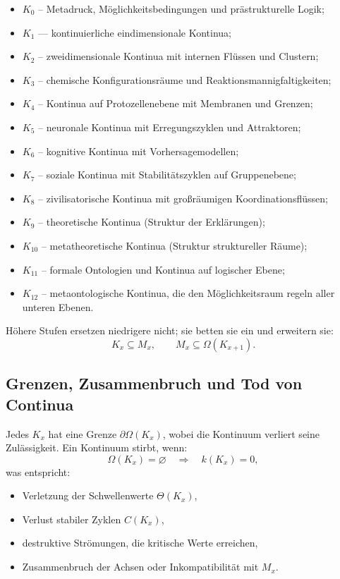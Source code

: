 \begin{itemize}
    \item $K_0$ – Metadruck, Möglichkeitsbedingungen und prästrukturelle Logik;
    \item $K_1$ — kontinuierliche eindimensionale Kontinua;
    \item $K_2$ – zweidimensionale Kontinua mit internen Flüssen und Clustern;
    \item $K_3$ – chemische Konfigurationsräume und Reaktionsmannigfaltigkeiten;
    \item $K_4$ – Kontinua auf Protozellenebene mit Membranen und Grenzen;
    \item $K_5$ – neuronale Kontinua mit Erregungszyklen und Attraktoren;
    \item $K_6$ – kognitive Kontinua mit Vorhersagemodellen;
    \item $K_7$ – soziale Kontinua mit Stabilitätszyklen auf Gruppenebene;
    \item $K_8$ – zivilisatorische Kontinua mit großräumigen Koordinationsflüssen;
    \item $K_9$ – theoretische Kontinua (Struktur der Erklärungen);
    \item $K_{10}$ – metatheoretische Kontinua (Struktur struktureller Räume);
    \item $K_{11}$ – formale Ontologien und Kontinua auf logischer Ebene;
    \item $K_{12}$ – metaontologische Kontinua, die den Möglichkeitsraum regeln
                     aller unteren Ebenen.
\end{itemize}

Höhere Stufen ersetzen niedrigere nicht; sie betten sie ein und erweitern sie:
\[
K_x \subseteq M_x,
\qquad
M_x \subseteq \Omega(K_{x+1}).
\]


\subsection{Grenzen, Zusammenbruch und Tod von Continua}

Jedes $K_x$ hat eine Grenze $\partial\Omega(K_x)$, wobei die
Kontinuum verliert seine Zulässigkeit.
Ein Kontinuum stirbt, wenn:
\[
\Omega(K_x) = \varnothing
\quad\Rightarrow\quad
k(K_x) = 0,
\]
was entspricht:
\begin{itemize}
    \item Verletzung der Schwellenwerte $\Theta(K_x)$,
    \item Verlust stabiler Zyklen $C(K_x)$,
    \item destruktive Strömungen, die kritische Werte erreichen,
    \item Zusammenbruch der Achsen oder Inkompatibilität mit $M_x$.
\end{itemize}

